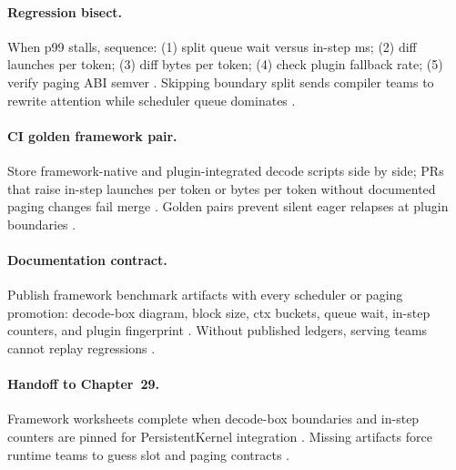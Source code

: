 \paragraph{Regression bisect.} When p99 stalls, sequence: (1) split queue wait versus in-step ms; (2) diff launches per token; (3) diff bytes per token; (4) check plugin fallback rate; (5) verify paging ABI semver \citep{taxbreak2026,memoryfloor2026,yirage2026,chen2020compilerbasedhardw,patel2025llminference,kwon2023vllm,liu2024deepseekv3,nvidia2024cudagraphs,dao2022flashattention,amd2024aie,amd2024xdna,dlbook,dao2023flashdecoding,nvidia2022hopper,semianalysis2024tma}. Skipping boundary split sends compiler teams to rewrite attention while scheduler queue dominates \citep{patel2025llminference,memoryfloor2026,yirage2026,chen2020compilerbasedhardw,kwon2023vllm,dlbook}.

\paragraph{CI golden framework pair.} Store framework-native and plugin-integrated decode scripts side by side; PRs that raise in-step launches per token or bytes per token without documented paging changes fail merge \citep{taxbreak2026,memoryfloor2026,yirage2026,chen2020compilerbasedhardw,patel2025llminference,kwon2023vllm,liu2024deepseekv3,nvidia2024cudagraphs,dao2022flashattention,amd2024aie,amd2024xdna,dlbook,dao2023flashdecoding,nvidia2022hopper,semianalysis2024tma}. Golden pairs prevent silent eager relapses at plugin boundaries \citep{patel2025llminference,yirage2026,chen2020compilerbasedhardw,kwon2023vllm,memoryfloor2026,taxbreak2026,dlbook}.

\paragraph{Documentation contract.} Publish framework benchmark artifacts with every scheduler or paging promotion: decode-box diagram, block size, ctx buckets, queue wait, in-step counters, and plugin fingerprint \citep{kwon2023vllm,patel2025llminference,yirage2026,chen2020compilerbasedhardw,taxbreak2026,memoryfloor2026,liu2024deepseekv3,nvidia2024cudagraphs,dao2022flashattention,amd2024aie,amd2024xdna,dlbook,dao2023flashdecoding,nvidia2022hopper,semianalysis2024tma}. Without published ledgers, serving teams cannot replay regressions \citep{patel2025llminference,yirage2026,chen2020compilerbasedhardw,kwon2023vllm,dlbook}.

\paragraph{Handoff to Chapter~29.} Framework worksheets complete when decode-box boundaries and in-step counters are pinned for PersistentKernel integration \citep{yirage2026,chen2020compilerbasedhardw,patel2025llminference,kwon2023vllm,taxbreak2026,memoryfloor2026,nvidia2024cudagraphs,dao2022flashattention,dlbook}. Missing artifacts force runtime teams to guess slot and paging contracts \citep{patel2025llminference,yirage2026,chen2020compilerbasedhardw,kwon2023vllm,memoryfloor2026,taxbreak2026,dlbook}.


